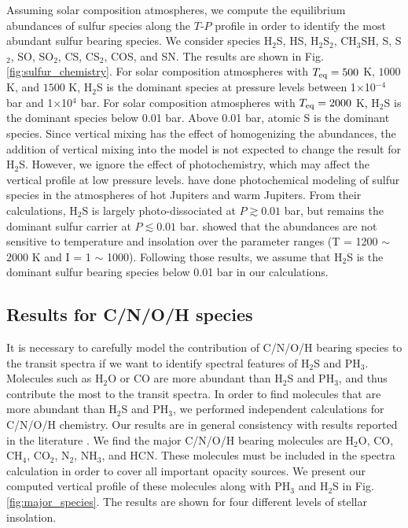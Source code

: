 \documentclass[twocolumn]{aastex61}
\begin{document}
Assuming solar composition atmospheres, we compute the equilibrium abundances of sulfur species along the $T$-$P$ profile in order to identify the most abundant sulfur bearing species. We consider species H$_2$S, HS, H$_2$S$_2$, CH$_3$SH, S, S$_2$, SO, SO$_2$, CS, CS$_2$, COS, and SN. The results are shown in Fig. \ref{fig:sulfur_chemistry}. For solar composition atmospheres with $T_{\rm eq} = 500$ K, $1000$ K, and $1500$ K, H$_2$S is the dominant species at pressure levels between 1$\times$10$^{-4}$ bar and 1$\times$10$^4$ bar. For solar composition atmospheres with $T_{\rm eq} = 2000$ K, H$_2$S is the dominant species below 0.01 bar. Above 0.01 bar, atomic S is the dominant species. Since vertical mixing has the effect of homogenizing the abundances, the addition of vertical mixing into the model is not expected to change the result for H$_2$S. However, we ignore the effect of photochemistry, which may affect the vertical profile at low pressure levels. \citet{Zahnle09b,Zahnle16} have done photochemical modeling of sulfur species in the atmospheres of hot Jupiters and warm Jupiters. From their calculations, H$_2$S is largely photo-dissociated at $P \gtrsim 0.01$ bar, but remains the dominant sulfur carrier at $P \lesssim 0.01$ bar. \citet{Zahnle09b} showed that the abundances are not sensitive to temperature and insolation over the parameter ranges (T = 1200 $\sim$ 2000 K and I = 1 $\sim$ 1000). Following those results, we assume that H$_2$S is the dominant sulfur bearing species below 0.01 bar in our calculations. 

\subsection{Results for C/N/O/H species}

It is necessary to carefully model the contribution of C/N/O/H bearing species to the transit spectra if we want to identify spectral features of H$_2$S and PH$_3$. Molecules such as H$_2$O or CO are more abundant than H$_2$S and PH$_3$, and thus contribute the most to the transit spectra. In order to find molecules that are more abundant than H$_2$S and PH$_3$, we performed independent calculations for C/N/O/H chemistry.  
Our results are in general consistency with results reported in the literature \citep[e.g.,][]{Moses11,Venot12,MK14,HS14}. We find the major C/N/O/H bearing molecules are H$_2$O, CO, CH$_4$, CO$_2$, N$_2$, NH$_3$, and HCN. These molecules must be included in the spectra calculation in order to cover all important opacity sources. We present our computed vertical profile of these molecules along with PH$_3$ and H$_2$S in Fig. \ref{fig:major_species}. The results are shown for four different levels of stellar insolation. 
\end{document}
